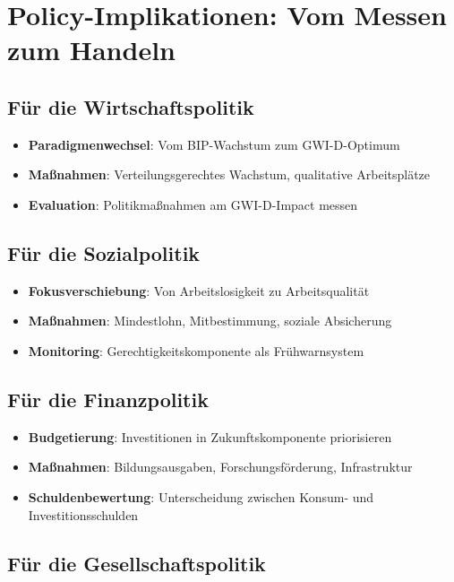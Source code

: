\section{Policy-Implikationen: Vom Messen zum Handeln}

\subsection{Für die Wirtschaftspolitik}

\begin{itemize}
    \item \textbf{Paradigmenwechsel}: Vom BIP-Wachstum zum GWI-D-Optimum
    \item \textbf{Maßnahmen}: Verteilungsgerechtes Wachstum, qualitative Arbeitsplätze
    \item \textbf{Evaluation}: Politikmaßnahmen am GWI-D-Impact messen
\end{itemize}

\subsection{Für die Sozialpolitik}

\begin{itemize}
    \item \textbf{Fokusverschiebung}: Von Arbeitslosigkeit zu Arbeitsqualität
    \item \textbf{Maßnahmen}: Mindestlohn, Mitbestimmung, soziale Absicherung
    \item \textbf{Monitoring}: Gerechtigkeitskomponente als Frühwarnsystem
\end{itemize}

\subsection{Für die Finanzpolitik}

\begin{itemize}
    \item \textbf{Budgetierung}: Investitionen in Zukunftskomponente priorisieren
    \item \textbf{Maßnahmen}: Bildungsausgaben, Forschungsförderung, Infrastruktur
    \item \textbf{Schuldenbewertung}: Unterscheidung zwischen Konsum- und Investitionsschulden
\end{itemize}

\subsection{Für die Gesellschaftspolitik}

